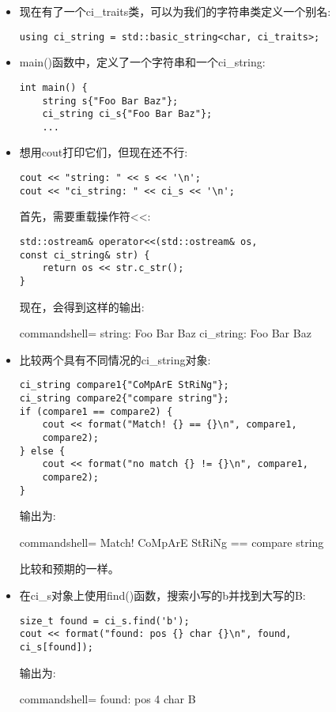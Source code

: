 \begin{itemize}
\item 
现在有了一个ci\_traits类，可以为我们的字符串类定义一个别名:

\begin{lstlisting}[style=styleCXX]
using ci_string = std::basic_string<char, ci_traits>;
\end{lstlisting}

\item 
main()函数中，定义了一个字符串和一个ci\_string:

\begin{lstlisting}[style=styleCXX]
int main() {
	string s{"Foo Bar Baz"};
	ci_string ci_s{"Foo Bar Baz"};
	...
\end{lstlisting}

\item 
想用cout打印它们，但现在还不行:

\begin{lstlisting}[style=styleCXX]
cout << "string: " << s << '\n';
cout << "ci_string: " << ci_s << '\n';
\end{lstlisting}

首先，需要重载操作符<{}<:

\begin{lstlisting}[style=styleCXX]
std::ostream& operator<<(std::ostream& os,
const ci_string& str) {
	return os << str.c_str();
}
\end{lstlisting}

现在，会得到这样的输出:

\begin{tcblisting}{commandshell={}}
string: Foo Bar Baz
ci_string: Foo Bar Baz
\end{tcblisting}

\item 
比较两个具有不同情况的ci\_string对象:

\begin{lstlisting}[style=styleCXX]
ci_string compare1{"CoMpArE StRiNg"};
ci_string compare2{"compare string"};
if (compare1 == compare2) {
	cout << format("Match! {} == {}\n", compare1,
	compare2);
} else {
	cout << format("no match {} != {}\n", compare1,
	compare2);
}
\end{lstlisting}

输出为:

\begin{tcblisting}{commandshell={}}
Match! CoMpArE StRiNg == compare string
\end{tcblisting}

比较和预期的一样。

\item 
在ci\_s对象上使用find()函数，搜索小写的b并找到大写的B:

\begin{lstlisting}[style=styleCXX]
size_t found = ci_s.find('b');
cout << format("found: pos {} char {}\n", found,
ci_s[found]);
\end{lstlisting}

输出为:

\begin{tcblisting}{commandshell={}}
found: pos 4 char B
\end{tcblisting}
\end{itemize}


